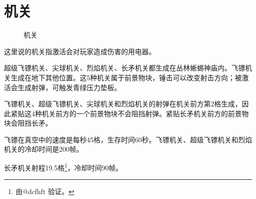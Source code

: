 \section{机关}
\begin{figure}[!ht]
\centering
{}\qquad
{}\qquad
{}\qquad
{}\qquad
{}\qquad
{}\qquad
{}\qquad
{}
\caption{机关}
\end{figure}
这里说的机关指激活会对玩家造成伤害的用电器。

超级飞镖机关、尖球机关、烈焰机关、长矛机关都生成在丛林蜥蜴神庙内。飞镖机关生成在地下其他位置。这5种机关属于前景物块，锤击可以改变射击方向；被激活会生成射弹，可触发青绿压力垫板。

飞镖机关、超级飞镖机关、尖球机关和烈焰机关的射弹在机关前方第2格生成，因此紧贴这4种机关前方的一个前景物块不会阻挡射弹。紧贴长矛机关前方的前景物块会阻挡长矛。

飞镖在真空中的速度是每秒45格，生存时间60秒。飞镖机关、超级飞镖机关和烈焰机关的冷却时间是200帧。

长矛机关射程19.5格\footnote{由@dcfhft 验证。}，冷却时间90帧。

